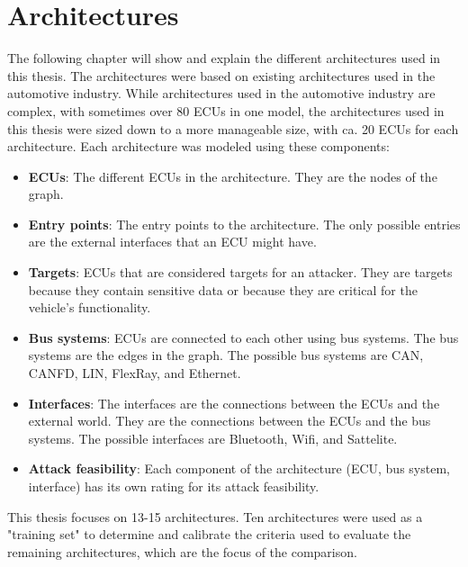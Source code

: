 \chapter{Architectures}
\label{chp:arch}

The following chapter will show and explain the different architectures used in this thesis.
The architectures were based on existing architectures used in the automotive industry.
While architectures used in the automotive industry are complex, with sometimes over 80 ECUs in one model, the architectures used in this thesis were sized down to a more manageable size, with ca. 20 ECUs for each architecture.
Each architecture was modeled using these components:

\begin{itemize}

    \item \textbf{ECUs}: The different ECUs in the architecture. They are the nodes of the graph.
    
    \item \textbf{Entry points}: The entry points to the architecture. The only possible entries are the external interfaces that an ECU might have.
    
    \item \textbf{Targets}: ECUs that are considered targets for an attacker. They are targets because they contain sensitive data or because they are critical for the vehicle's functionality.
    
    \item \textbf{Bus systems}: ECUs are connected to each other using bus systems. The bus systems are the edges in the graph. The possible bus systems are CAN, CANFD, LIN, FlexRay, and Ethernet.
    
    \item \textbf{Interfaces}: The interfaces are the connections between the ECUs and the external world. They are the connections between the ECUs and the bus systems. The possible interfaces are Bluetooth, Wifi, and Sattelite.
    
    \item \textbf{Attack feasibility}: Each component of the architecture (ECU, bus system, interface) has its own rating for its attack feasibility.

\end{itemize}

This thesis focuses on 13-15 architectures.
Ten architectures were used as a "training set" to determine and calibrate the criteria used to evaluate the remaining architectures, which are the focus of the comparison. 

